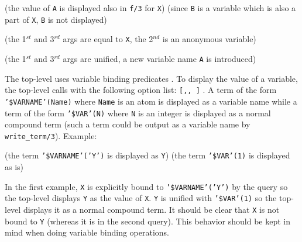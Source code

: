 \begin{CodeTwoCols}
\SkipLine
{} {(the value of \texttt{A} is displayed also in \texttt{f/3} for
\texttt{X})}
 {(since \texttt{B} is a variable which is also a part
of \texttt{X}, \texttt{B} is not displayed)}
\end{CodeTwoCols}

\begin{CodeTwoCols}
\SkipLine
{} {(the 1$^{st}$ and 3$^{rd}$ args are equal to \texttt{X},
the 2$^{nd}$ is an anonymous variable)}
\end{CodeTwoCols}

\begin{CodeTwoCols}
\SkipLine
{} {(the 1$^{st}$ and 3$^{rd}$ args are unified, a new
variable name \texttt{A} is introduced)}
\end{CodeTwoCols}

The top-level uses variable binding predicates . To display the value of a variable, the top-level calls
 with the following option list:
\texttt{[,,
]} . A term of the
form \texttt{'\$VARNAME'(Name)} where \texttt{Name} is an atom is displayed
as a variable name while a term of the form \texttt{'\$VAR'(N)} where
\texttt{N} is an integer is displayed as a normal compound term (such a term
could be output as a variable name by \texttt{write\_term/3}). Example:

\begin{CodeTwoCols}
\SkipLine
{} {(the term \texttt{'\$VARNAME'('Y')} is displayed as \texttt{Y})}
 {(the term \texttt{'\$VAR'(1)} is displayed as is)}
\end{CodeTwoCols}

\begin{CodeTwoCols}
\SkipLine
{}
\end{CodeTwoCols}

In the first example, \texttt{X} is explicitly bound to
\texttt{'\$VARNAME'('Y')} by the query so the top-level displays \texttt{Y}
as the value of \texttt{X}. \texttt{Y} is unified with \texttt{'\$VAR'(1)} so
the top-level displays it as a normal compound term. It should be clear that
\texttt{X} is not bound to \texttt{Y} (whereas it is in the second
query). This behavior should be kept in mind when doing variable binding
operations.

